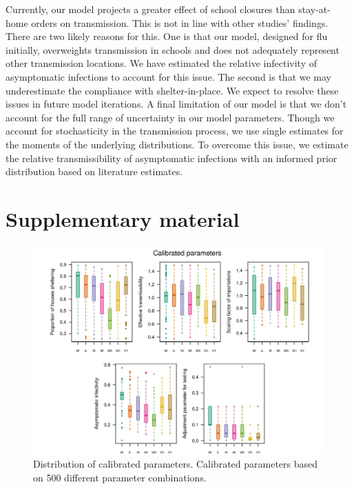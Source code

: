 \documentclass[11pt]{article}
\begin{document}
Currently, our model projects a greater effect of school closures than stay-at-home orders on transmission. This is not in line with other studies’ findings. There are two likely reasons for this. One is that our model, designed for flu initially, overweights transmission in schools and does not adequately represent other transmission locations. We have estimated the relative infectivity of asymptomatic infections to account for this issue. The second is that we may underestimate the compliance with shelter-in-place. We expect to resolve these issues in future model iterations. A final limitation of our model is that we don’t account for the full range of uncertainty in our model parameters. Though we account for stochasticity in the transmission process, we use single estimates for the moments of the underlying distributions. To overcome this issue, we estimate the relative transmissibility of asymptomatic infections with an informed prior distribution based on literature estimates. 

\clearpage
\printbibliography


\section*{Supplementary material}
\setcounter{table}{0}
\renewcommand{\thetable}{S\arabic{table}}%
\setcounter{figure}{0}
\renewcommand{\thefigure}{S\arabic{figure}}%

\begin{figure}[hb!]
\centering
\includegraphics[width=\textwidth]{../figures/report_figure_calibrated_parameters.jpeg} 
\caption{\label{fig_calibrated_parameters}Distribution of calibrated parameters. Calibrated parameters based on 500 different parameter combinations.}
\end{figure}
\end{document}
